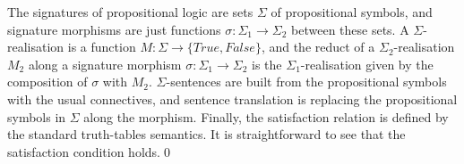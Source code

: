 \documentclass[10pt, a4paper]{isov2}
\begin{document}
\begin{definition}\label{Prop}
The signatures of propositional logic are sets $\Sigma$ of propositional symbols, and signature morphisms are just
functions $\sigma:{\Sigma_1}\to{\Sigma_2}$ between these sets. 
A $\Sigma$-realisation is a function $M : {\Sigma}\to{\{True, False\}}$, and the reduct of a 
$\Sigma_2$-realisation $M_2$ along a signature morphism $\sigma:{\Sigma_1}\to{\Sigma_2}$ is 
the $\Sigma_1$-realisation given by the composition of $\sigma$ with $M_2$. $\Sigma$-sentences are built from the
propositional symbols with the usual connectives, and sentence translation is replacing the propositional
symbols in $\Sigma$ along the morphism. Finally, the satisfaction relation is defined by the standard truth-tables
semantics. It is straightforward to see that the satisfaction condition holds.\quad\qed
\end{definition}
\end{document}
